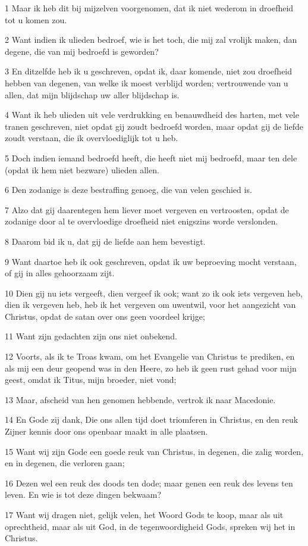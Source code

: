 \par 1 Maar ik heb dit bij mijzelven voorgenomen, dat ik niet wederom in droefheid tot u komen zou.
\par 2 Want indien ik ulieden bedroef, wie is het toch, die mij zal vrolijk maken, dan degene, die van mij bedroefd is geworden?
\par 3 En ditzelfde heb ik u geschreven, opdat ik, daar komende, niet zou droefheid hebben van degenen, van welke ik moest verblijd worden; vertrouwende van u allen, dat mijn blijdschap uw aller blijdschap is.
\par 4 Want ik heb ulieden uit vele verdrukking en benauwdheid des harten, met vele tranen geschreven, niet opdat gij zoudt bedroefd worden, maar opdat gij de liefde zoudt verstaan, die ik overvloediglijk tot u heb.
\par 5 Doch indien iemand bedroefd heeft, die heeft niet mij bedroefd, maar ten dele (opdat ik hem niet bezware) ulieden allen.
\par 6 Den zodanige is deze bestraffing genoeg, die van velen geschied is.
\par 7 Alzo dat gij daarentegen hem liever moet vergeven en vertroosten, opdat de zodanige door al te overvloedige droefheid niet enigszins worde verslonden.
\par 8 Daarom bid ik u, dat gij de liefde aan hem bevestigt.
\par 9 Want daartoe heb ik ook geschreven, opdat ik uw beproeving mocht verstaan, of gij in alles gehoorzaam zijt.
\par 10 Dien gij nu iets vergeeft, dien vergeef ik ook; want zo ik ook iets vergeven heb, dien ik vergeven heb, heb ik het vergeven om uwentwil, voor het aangezicht van Christus, opdat de satan over ons geen voordeel krijge;
\par 11 Want zijn gedachten zijn ons niet onbekend.
\par 12 Voorts, als ik te Troas kwam, om het Evangelie van Christus te prediken, en als mij een deur geopend was in den Heere, zo heb ik geen rust gehad voor mijn geest, omdat ik Titus, mijn broeder, niet vond;
\par 13 Maar, afscheid van hen genomen hebbende, vertrok ik naar Macedonie.
\par 14 En Gode zij dank, Die ons allen tijd doet triomferen in Christus, en den reuk Zijner kennis door ons openbaar maakt in alle plaatsen.
\par 15 Want wij zijn Gode een goede reuk van Christus, in degenen, die zalig worden, en in degenen, die verloren gaan;
\par 16 Dezen wel een reuk des doods ten dode; maar genen een reuk des levens ten leven. En wie is tot deze dingen bekwaam?
\par 17 Want wij dragen niet, gelijk velen, het Woord Gods te koop, maar als uit oprechtheid, maar als uit God, in de tegenwoordigheid Gods, spreken wij het in Christus.

